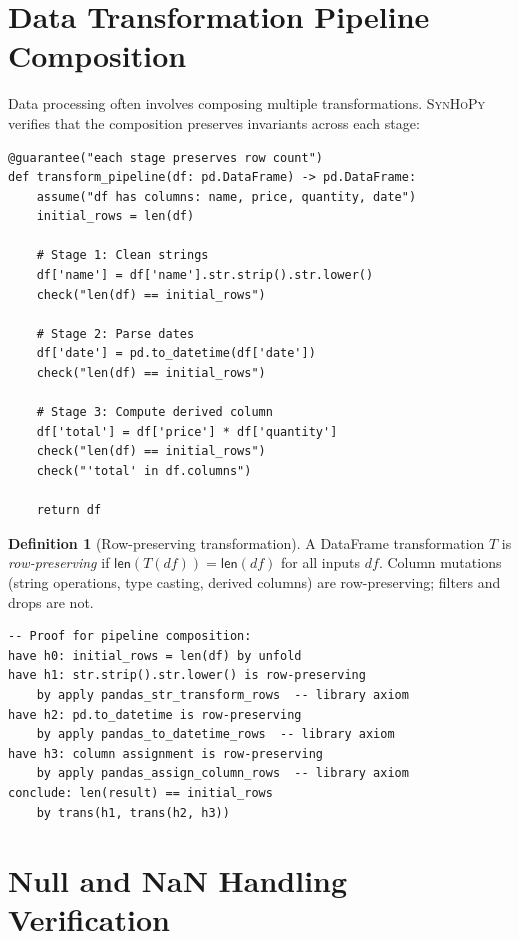 \documentclass[11pt,a4paper]{report}
\theoremstyle{definition}
\newtheorem{definition}{Definition}[chapter]
\theoremstyle{plain}
\newcommand{\synhopy}{\textsc{SynHoPy}}
\begin{document}
\section{Data Transformation Pipeline Composition}

Data processing often involves composing multiple transformations.
\synhopy{} verifies that the composition preserves invariants across
each stage:

\begin{lstlisting}[style=synhopy]
@guarantee("each stage preserves row count")
def transform_pipeline(df: pd.DataFrame) -> pd.DataFrame:
    assume("df has columns: name, price, quantity, date")
    initial_rows = len(df)

    # Stage 1: Clean strings
    df['name'] = df['name'].str.strip().str.lower()
    check("len(df) == initial_rows")

    # Stage 2: Parse dates
    df['date'] = pd.to_datetime(df['date'])
    check("len(df) == initial_rows")

    # Stage 3: Compute derived column
    df['total'] = df['price'] * df['quantity']
    check("len(df) == initial_rows")
    check("'total' in df.columns")

    return df
\end{lstlisting}

\begin{definition}[Row-preserving transformation]
A DataFrame transformation $T$ is \emph{row-preserving} if
$\mathsf{len}(T(\mathit{df})) = \mathsf{len}(\mathit{df})$ for all
inputs $\mathit{df}$.  Column mutations (string operations, type casting,
derived columns) are row-preserving; filters and drops are not.
\end{definition}

\begin{lstlisting}[style=proof]
-- Proof for pipeline composition:
have h0: initial_rows = len(df) by unfold
have h1: str.strip().str.lower() is row-preserving
    by apply pandas_str_transform_rows  -- library axiom
have h2: pd.to_datetime is row-preserving
    by apply pandas_to_datetime_rows  -- library axiom
have h3: column assignment is row-preserving
    by apply pandas_assign_column_rows  -- library axiom
conclude: len(result) == initial_rows
    by trans(h1, trans(h2, h3))
\end{lstlisting}

\section{Null and NaN Handling Verification}
\end{document}
